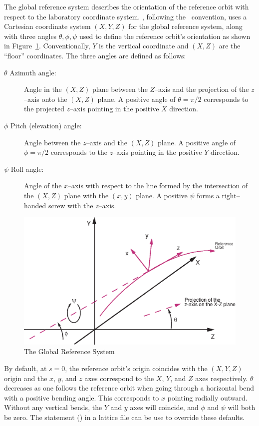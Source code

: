 The global reference system describes the orientation of the reference
orbit with respect to the laboratory coordinate system.  \bmad,
following the \mad\ convention, uses a Cartesian coordinate system
$(X, Y, Z)$ for the global reference system, along with three angles
$\theta, \phi, \psi$ used to define the reference orbit's orientation
as shown in Figure~\ref{f:global.coords}. Conventionally, $Y$ is the
vertical coordinate and $(X, Z)$ are the ``floor'' coordinates.  The
three angles are defined as follows:
\begin{description}
\item[$\theta$ Azimuth angle:] Angle in the $(X, Z)$ plane 
between the $Z$--axis and the projection of the $z$--axis onto the
$(X, Z)$ plane. A positive angle of $\theta = \pi/2$ corresponds to the
projected $z$--axis pointing in the positive $X$ direction.
\item[$\phi$ Pitch (elevation) angle:] Angle between the $z$--axis 
and the $(X,Z)$ plane. A positive angle of $\phi = \pi/2$ corresponds to
the $z$--axis pointing in the positive $Y$ direction.
\item[$\psi$ Roll angle:] Angle of the $x$--axis with respect 
to the line formed by the
intersection of the $(X, Z)$ plane with the $(x, y)$ plane. A
positive $\psi$ forms a right--handed screw with the $z$--axis.
\end{description}

\begin{figure}
\centering
\includegraphics{global-coords.eps}
\caption{The Global Reference System}
\label{f:global.coords}
\end{figure}

By default, at $s = 0$, the reference orbit's origin coincides with
the $(X, Y, Z)$ origin and the $x$, $y$, and $z$ axes correspond to
the $X$, $Y$, and $Z$ axes respectively. $\theta$ decreases as one
follows the reference orbit when going through a horizontal bend with
a positive bending angle. This corresponds to $x$ pointing radially
outward. Without any vertical bends, the $Y$ and $y$ axes will
coincide, and $\phi$ and $\psi$ will both be zero. The 
statement () in a lattice file can be use to
override these defaults.

